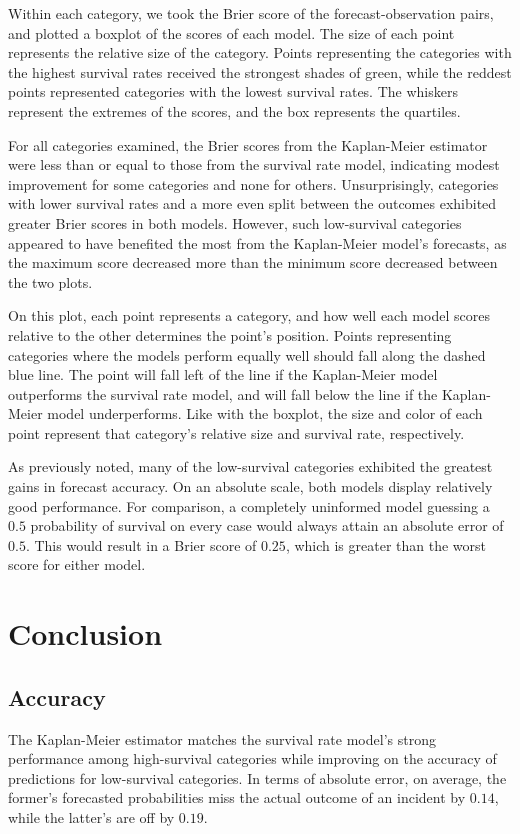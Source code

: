 \documentclass[12pt,titlepage]{article}
\begin{document}
    Within each category, we took the Brier score of the forecast-observation
    pairs, and plotted a boxplot of the scores of each model. The size of each
    point represents the relative size of the category. Points representing the
    categories with the highest survival rates received the strongest shades of
    green, while the reddest points represented categories with the lowest
    survival rates. The whiskers represent the extremes of the scores, and the
    box represents the quartiles.

    For all categories examined, the Brier scores from the Kaplan-Meier
    estimator were less than or equal to those from the survival rate model,
    indicating modest improvement for some categories and none for others.
    Unsurprisingly, categories with lower survival rates and a more even split
    between the outcomes exhibited greater Brier scores in both models.
    However, such low-survival categories appeared to have benefited the most
    from the Kaplan-Meier model's forecasts, as the maximum score decreased
    more than the minimum score decreased between the two plots.

    

    On this plot, each point represents a category, and how well each model
    scores relative to the other determines the point's position. Points
    representing categories where the models perform equally well should fall
    along the dashed blue line. The point will fall left of the line if the
    Kaplan-Meier model outperforms the survival rate model, and will fall below
    the line if the Kaplan-Meier model underperforms. Like with the boxplot,
    the size and color of each point represent that category's relative size
    and survival rate, respectively.

    As previously noted, many of the low-survival categories exhibited the
    greatest gains in forecast accuracy. On an absolute scale, both models
    display relatively good performance. For comparison, a completely
    uninformed model guessing a $0.5$ probability of survival on every case
    would always attain an absolute error of $0.5$. This would result in a
    Brier score of $0.25$, which is greater than the worst score for either
    model.

  \section{Conclusion}
    \subsection{Accuracy}
      The Kaplan-Meier estimator matches the survival rate model's strong
      performance among high-survival categories while improving on the
      accuracy of predictions for low-survival categories. In terms of absolute
      error, on average, the former's forecasted probabilities miss the actual
      outcome of an incident by $0.14$, while the latter's are off by $0.19$.
\end{document}
